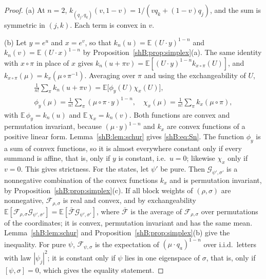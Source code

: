 \begin{proof}
(a) At $n=2$, $k_{(q_j,q_k)}(v,1-v)=1/(vq_k+(1-v)q_j)$, and the sum is symmetric in $(j,k)$. Each term is convex in $v$.

(b) Let $y=e^u$ and $x=e^v$, so that $k_n(u)=\mathbb E\,(U\cdot y)^{1-n}$ and $k_n(v)=\mathbb E\,(U\cdot x)^{1-n}$ by Proposition~\ref{shB:prop:simplex}(a). The same identity with $x\circ\pi$ in place of $x$ gives $k_n(u+\pi v)=\mathbb E[(U\cdot y)^{1-n}k_{x\circ\pi}(U)]$, and $k_{x\circ\pi}(\mu)=k_x(\mu\circ\pi^{-1})$. Averaging over $\pi$ and using the exchangeability of $U$,
\begin{gather*}
\frac1{n!}\sum_\pi k_n(u+\pi v)=\mathbb E\big[\phi_y(U)\chi_x(U)\big],\\
\phi_y(\mu)=\frac1{n!}\sum_\pi(\mu\circ\pi\cdot y)^{1-n},\quad \chi_x(\mu)=\frac1{n!}\sum_\pi k_x(\mu\circ\pi),
\end{gather*}
with $\mathbb E\,\phi_y=k_n(u)$ and $\mathbb E\,\chi_x=k_n(v)$. Both functions are convex and permutation invariant, because $(\mu\cdot y)^{1-n}$ and $k_x$ are convex functions of a positive linear form. Lemma~\ref{shB:lem:schur} gives \eqref{shB:eq:Sn}. The function $\phi_y$ is a sum of convex functions, so it is almost everywhere constant only if every summand is affine, that is, only if $y$ is constant, i.e.\ $u=0$; likewise $\chi_x$ only if $v=0$. This gives strictness. For the states, let $\psi'$ be pure. Then $\mathcal G_{\psi',\sigma'}$ is a nonnegative combination of the convex functions $k_x$ and is permutation invariant, by Proposition~\ref{shB:prop:simplex}(c). If all block weights of $(\rho,\sigma)$ are nonnegative, $\mathcal F_{\rho,\sigma}$ is real and convex, and by exchangeability $\mathbb E[\mathcal F_{\rho,\sigma}\mathcal G_{\psi',\sigma'}]=\mathbb E[\bar{\mathcal F}\mathcal G_{\psi',\sigma'}]$, where $\bar{\mathcal F}$ is the average of $\mathcal F_{\rho,\sigma}$ over permutations of the coordinates; it is convex, permutation invariant and has the same mean. Lemma~\ref{shB:lem:schur} and Proposition~\ref{shB:prop:simplex}(b) give the inequality. For pure $\psi$, $\mathcal F_{\psi,\sigma}$ is the expectation of $(\mu\cdot q_a)^{1-n}$ over i.i.d.\ letters with law $|\psi_j|^2$; it is constant only if $\psi$ lies in one eigenspace of $\sigma$, that is, only if $[\psi,\sigma]=0$, which gives the equality statement.


\end{proof}
